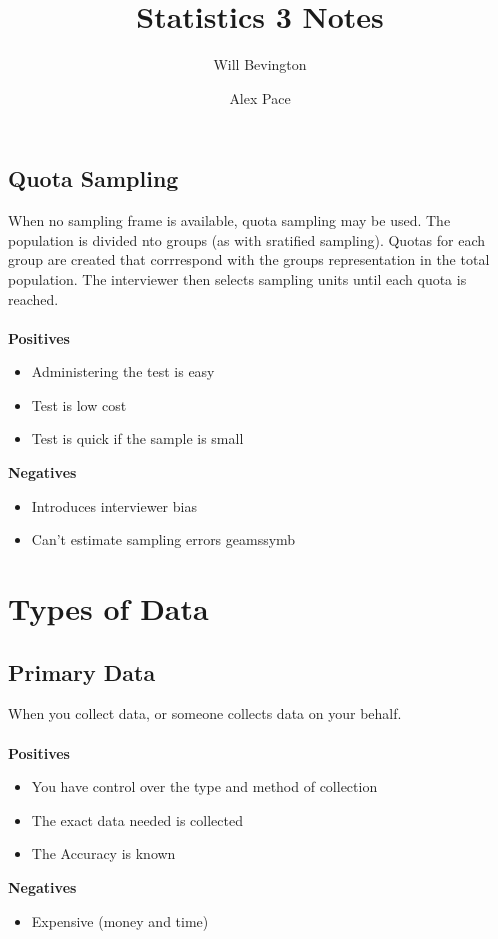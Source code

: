 \documentclass{article}
\begin{document}
\begin{description}
		\subsection{Quota Sampling}
			When no sampling frame is available, quota sampling may be used. The population is divided nto groups (as with sratified sampling). Quotas for each group are created that corrrespond with the groups representation in the total population. The interviewer then selects sampling units until each quota is reached. \\\\
			\textbf{Positives}
                        \begin{itemize}
				\item Administering the test is easy
				\item Test is low cost
				\item Test is quick if the sample is small
                        \end{itemize}
                        \textbf{Negatives}
                        \begin{itemize}
                        	\item Introduces interviewer bias
				\item Can't estimate sampling errors
 ge{amssymb}
\usepackage{geometry}
\usepackage[round]{natbib}

\title{Statistics 3 Notes}
\author{Will Bevington \and Alex Pace}

                       \end{itemize}
	\section{Types of Data}
		\subsection{Primary Data}
			When you collect data, or someone collects data on your behalf. \\\\
			\textbf{Positives}
                        \begin{itemize}
				\item You have control over the type and method of collection
				\item The exact data needed is collected
				\item The Accuracy is known
                        \end{itemize}
                        \textbf{Negatives}
                        \begin{itemize}
                        	\item Expensive (money and time)
                        \end{itemize}

\end{description}
\end{document}
